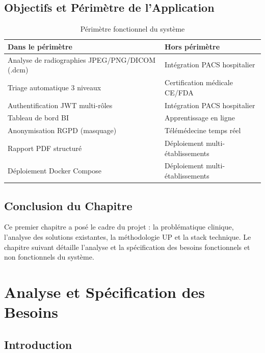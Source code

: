 \documentclass[12pt, a4paper]{report}
\begin{document}
\section{Objectifs et Périmètre de l'Application}

\begin{table}[H]
\centering
\caption{Périmètre fonctionnel du système}
\begin{tabularx}{\textwidth}{L{5.5cm} X}
\toprule
\textbf{Dans le périmètre} & \textbf{Hors périmètre} \\
\midrule
Analyse de radiographies JPEG/PNG/DICOM (.dcm) & Intégration PACS hospitalier \\
Triage automatique 3 niveaux & Certification médicale CE/FDA \\
Authentification JWT multi-rôles & Intégration PACS hospitalier \\
Tableau de bord BI & Apprentissage en ligne \\
Anonymisation RGPD (masquage) & Télémédecine temps réel \\
Rapport PDF structuré & Déploiement multi-établissements \\
Déploiement Docker Compose & Déploiement multi-établissements \\
\bottomrule
\end{tabularx}
\end{table}

\section{Conclusion du Chapitre}

Ce premier chapitre a posé le cadre du projet : la problématique clinique,
l'analyse des solutions existantes, la méthodologie UP et la stack technique.
Le chapitre suivant détaille l'analyse et la spécification des besoins fonctionnels
et non fonctionnels du système.

\chapter{Analyse et Spécification des Besoins}

\section{Introduction}
\end{document}
